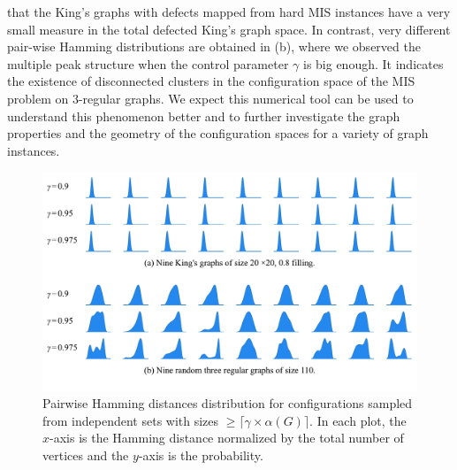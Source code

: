 \documentclass[review, onefignum, onetabnum]{siamart190516}
\begin{document}
that the King's graphs with defects mapped from hard MIS instances have a very small measure in the total defected King's graph space. In contrast, 
very different pair-wise Hamming distributions are obtained in (b), where we observed the multiple peak structure when the control parameter $\gamma$ is big enough. It indicates the existence of disconnected clusters in the configuration space of the MIS problem on $3$-regular graphs.
We expect this numerical tool can be used to understand this phenomenon better and to further investigate the graph properties and the geometry of the configuration spaces for a variety of graph instances.
\begin{figure} 
    \includegraphics[width=\textwidth, trim={0.0cm 1cm 0.0cm 0cm}, clip]{figures/fig6.pdf}
    \caption{Pairwise Hamming distances distribution for configurations sampled from independent sets with sizes $\geq \lceil\gamma \times \alpha(G)\rceil$.
    In each plot, the $x$-axis is the Hamming distance normalized by the total number of vertices and the $y$-axis is the probability.
    }
    \label{fig:hamming}
\end{figure}
\end{document}
